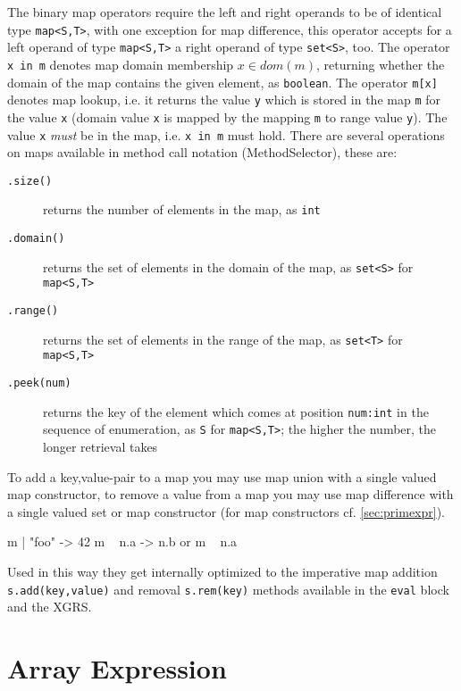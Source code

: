 The binary map operators require the left and right operands to be of identical type \verb#map<S,T>#,
with one exception for map difference, this operator accepts for a left operand of type \verb#map<S,T># a right operand of type \verb#set<S>#, too.
The operator \texttt{x in m} denotes map domain membership $x \in dom(m)$, returning whether the domain of the map contains the given element, as \texttt{boolean}.
The operator \texttt{m[x]} denotes map lookup, i.e. it returns the value \texttt{y} which is stored in the map \texttt{m} for the value \texttt{x} (domain value \texttt{x} is mapped by the mapping \texttt{m} to range value \texttt{y}). The value \texttt{x} \emph{must} be in the map, i.e. \texttt{x in m} must hold.
There are several operations on maps available in method call notation (MethodSelector), these are:

\begin{description}
\item[\texttt{.size()}] returns the number of elements in the map, as \texttt{int}
\item[\texttt{.domain()}] returns the set of elements in the domain of the map, as \verb#set<S># for \verb#map<S,T>#
\item[\texttt{.range()}] returns the set of elements in the range of the map, as \verb#set<T># for \verb#map<S,T>#
\item[\texttt{.peek(num)}] returns the key of the element which comes at position \texttt{num:int} in the sequence of enumeration, as \texttt{S} for \verb#map<S,T>#; the higher the number, the longer retrieval takes
\end{description}

\begin{note}
To add a key,value-pair to a map you may use map union with a single valued map constructor,
to remove a value from a map you may use map difference with a single valued set or map constructor (for map constructors cf. \ref{sec:primexpr}).
\begin{grgen}
m | { "foo" -> 42 }
m \ { n.a -> n.b } or m \ { n.a }
\end{grgen}
Used in this way they get internally optimized to the imperative map addition \texttt{s.add(key,value)} and removal \texttt{s.rem(key)} methods available in the \texttt{eval} block and the XGRS.
\end{note}


\section{Array Expression} \label{sec:arrayexpr}

